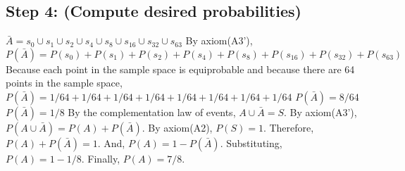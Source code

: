 \documentclass[a4paper,10pt]{article}
\begin{document}
\subsection{Step 4: (Compute desired probabilities)}
$ \bar{A} = s_{0} \cup s_{1} \cup s_{2} \cup s_{4} \cup s_{8} \cup s_{16} \cup s_{32} \cup s_{63} $ \newline
By axiom(A3'), \newline
$ P(\bar{A}) = P(s_{0}) + P(s_{1}) + P(s_{2}) + P(s_{4}) + P(s_{8}) + P(s_{16}) + P(s_{32}) + P(s_{63}) $ \newline
Because each point in the sample space is equiprobable and because there are 64 points in the sample space, \newline
$ P(\bar{A}) = 1/64 + 1/64 + 1/64 + 1/64 + 1/64 + 1/64 + 1/64 + 1/64 $ \newline
$ P(\bar{A}) = 8/64 $ \newline
$ P(\bar{A}) = 1/8 $ \newline
By the complementation law of events, $ A \cup \bar{A} = S. $ \newline
By axiom(A3'), $ P(A \cup \bar{A}) = P(A) + P(\bar{A}). $ \newline
By axiom(A2), $ P(S) = 1. $ \newline
Therefore, $ P(A) + P(\bar{A}) = 1. $ \newline
And, $ P(A) = 1 - P(\bar{A}). $ \newline
Substituting, $ P(A) = 1 - 1/8. $ \newline
Finally, $ P(A) = 7/8. $ \newline 
\end{document}
